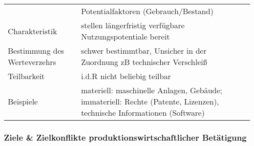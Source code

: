 \documentclass[11pt]{article}
\begin{document}
\begin{center}
\begin{tabular}{ll}
 & Potentialfaktoren (Gebrauch/Bestand)\\
Charakteristik & stellen längerfristig verfügbare Nutzungspotentiale bereit\\
Bestimmung des Werteverzehrs & schwer bestimmtbar, Unsicher in der Zuordnung zB technischer Verschleiß\\
Teilbarkeit & i.d.R nicht beliebig teilbar\\
Beispiele & materiell: maschinelle Anlagen, Gebäude; immateriell: Rechte (Patente, Lizenzen), technische Informationen (Software)\\
\end{tabular}
\end{center}

\subsubsection{Ziele \& Zielkonflikte produktionswirtschaftlicher Betätigung}
\label{sec:org4a616ee}
\end{document}
